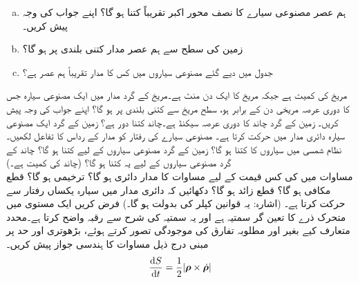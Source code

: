 \begin{enumerate}[a.]
\item
ہم عصر مصنوعی سیارے کا نصف محور اکبر تقریباً کتنا ہو گا؟ اپنے جواب کی وجہ پیش کریں۔
\item
زمین کی سطح سے ہم عصر مدار کتنی  بلندی پر ہو گا؟
\item
جدول   میں دیے گئے مصنوعی سیاروں میں کس کا مدار تقریباً ہم عصر ہے؟
\end{enumerate}
مریخ کی کمیت  ہے  جبکہ مریخ کا ایک  دن  منٹ  ہے۔مریخ کے گرد مدار میں ایک مصنوعی سیارہ جس کا  دوری عرصہ مریخی دن کے برابر ہو، سطح مریخ سے کتنی بلندی پر ہو گا؟ اپنے جواب کی وجہ پیش کریں۔
زمین کے گرد چاند  کا دوری عرصہ  سیکنڈ  ہے۔چاند کتنا دور ہے؟
زمین کے گرد ایک مصنوعی سیارہ دائری مدار میں حرکت کرتا  ہے۔ مصنوعی سیارے کی رفتار کو مدار کے رداس کا تفاعل لکھیں۔
نظام شمسی میں سیاروں کا  کتنا ہو گا؟ زمین کے گرد مصنوعی سیاروں کے لیے کتنا ہو گا؟ چاند کے گرد مصنوعی سیاروں کے لیے یہ کتنا ہو گا؟ (چاند کی کمیت  ہے۔)
\\
مساوات  میں   کی کس قیمت کے لیے  مساوات  کا مدار دائری ہو گا؟ ترخیمی ہو گا؟ قطع مکافی ہو گا؟ قطع زائد ہو گا؟
دکھائیں کہ دائری مدار میں سیارہ یکساں رفتار سے حرکت کرتا ہے۔ (اشارہ: یہ قوانین کپلر کی بدولت ہو گا۔)
فرض کریں  ایک مستوی میں متحرک ذرے کا تعین گر سمتیہ  ہے اور  یہ  سمتیہ  کی شرح سے رقبہ واضح کرتا ہے۔محدد متعارف کیے بغیر اور مطلوبہ تفارق  کی موجودگی تصور کرتے ہوئے، بڑھوتری اور حد  پر مبنی  درج ذیل مساوات کا ہندسی جواز پیش کریں۔ 
\begin{align*}
\frac{\dif S}{\dif t}=\frac{1}{2}\abs{\kvec{\rho}\times \dot{\kvec{\rho}}}
\end{align*}
